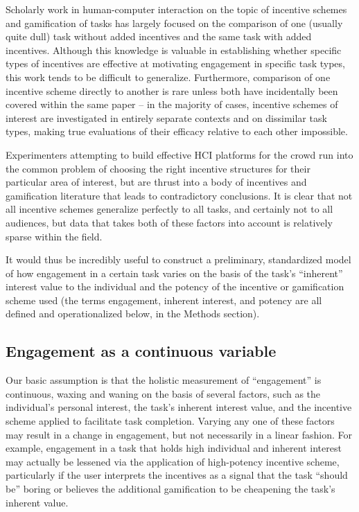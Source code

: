 Scholarly work in human-computer interaction on the topic of incentive schemes and gamification of tasks has largely focused on the comparison of one (usually quite dull) task without added incentives and the same task with added incentives. Although this knowledge is valuable in establishing whether specific types of incentives are effective at motivating engagement in specific task types, this work tends to be difficult to generalize. Furthermore, comparison of one incentive scheme directly to another is rare unless both have incidentally been covered within the same paper -- in the majority of cases, incentive schemes of interest are investigated in entirely separate contexts and on dissimilar task types, making true evaluations of their efficacy relative to each other impossible.

Experimenters attempting to build effective HCI platforms for the crowd run into the common problem of choosing the right incentive structures for their particular area of interest, but are thrust into a body of incentives and gamification literature that leads to contradictory conclusions. It is clear that not all incentive schemes generalize perfectly to all tasks, and certainly not to all audiences, but data that takes both of these factors into account is relatively sparse within the field.

It would thus be incredibly useful to construct a preliminary, standardized model of how engagement in a certain task varies on the basis of the task's “inherent” interest value to the individual and the potency of the incentive or gamification scheme used (the terms engagement, inherent interest, and potency are all defined and operationalized below, in the Methods section).

\subsection{Engagement as a continuous variable}

Our basic assumption is that the holistic measurement of “engagement” is continuous, waxing and waning on the basis of several factors, such as the individual’s personal interest, the task’s inherent interest value, and the incentive scheme applied to facilitate task completion. Varying any one of these factors may result in a change in engagement, but not necessarily in a linear fashion. For example, engagement in a task that holds high individual and inherent interest may actually be lessened via the application of high-potency incentive scheme, particularly if the user interprets the incentives as a signal that the task “should be” boring or believes the additional gamification to be cheapening the task’s inherent value.

